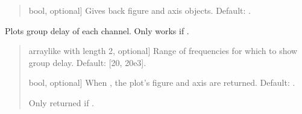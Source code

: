 \documentclass[letterpaper,10pt,english]{sphinxmanual}
\begin{document}
\begin{fulllineitems}
\begin{fulllineitems}
\begin{quote}
\begin{description}
\begin{description}
\sphinxlineitem{\sphinxstylestrong{returns}}{[}bool, optional{]}
\sphinxAtStartPar
Gives back figure and axis objects. Default: .

\end{description}

\begin{description}
\end{description}

\end{description}\end{quote}

\end{fulllineitems}


\begin{fulllineitems}
\label{\detokenize{classes:dsptools.classes.signal_class.Signal.plot_group_delay}}
\pysigstartsignatures
{}
\pysigstopsignatures
\sphinxAtStartPar
Plots group delay of each channel.
Only works if .
\begin{quote}\begin{description}
\begin{description}
\sphinxlineitem{\sphinxstylestrong{range\_hz}}{[}array\sphinxhyphen{}like with length 2, optional{]}
\sphinxAtStartPar
Range of frequencies for which to show group delay.
Default: {[}20, 20e3{]}.

\sphinxlineitem{\sphinxstylestrong{returns}}{[}bool, optional{]}
\sphinxAtStartPar
When , the plot’s figure and axis are returned.
Default: .

\end{description}

\begin{description}
\sphinxAtStartPar
Only returned if .


\end{description}
\end{description}
\end{quote}
\end{fulllineitems}
\end{fulllineitems}
\end{document}
